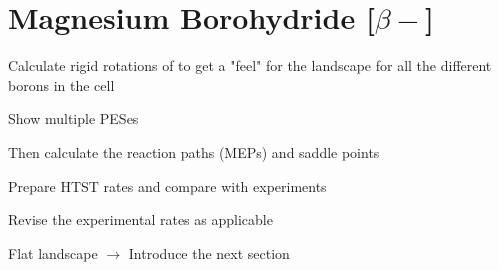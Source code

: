 \section{Magnesium Borohydride [$\beta-$]}
\label{sec:borohydrides-magnesium}

\bit
\item Calculate rigid rotations of  to get a "feel" for the landscape for all the different borons in the cell
\item Show multiple PESes
\item Then calculate the reaction paths (MEPs) and saddle points
\item Prepare HTST rates and compare with experiments
\item Revise the experimental rates as applicable
\item Flat landscape $\rightarrow$ Introduce the next section
\eit

\placeholder
